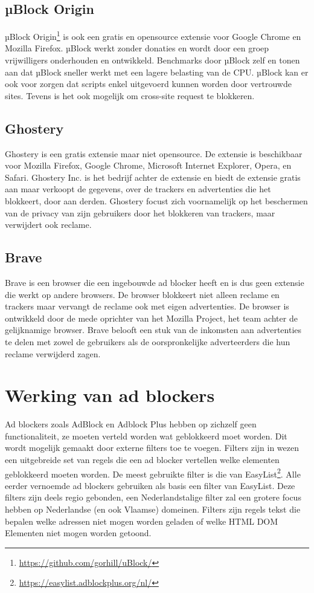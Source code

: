 \documentclass[pdftex,a4paper,12pt,twoside]{report}
\begin{document}
\subsection{µBlock Origin}
\label{sec:uBlock Origin}
µBlock Origin\footnote{\url{https://github.com/gorhill/uBlock/}} is ook een gratis en opensource extensie voor Google Chrome en Mozilla Firefox. µBlock werkt zonder donaties en wordt door een groep vrijwilligers onderhouden en ontwikkeld. Benchmarks door µBlock zelf en \citep{PerformanceAB} tonen aan dat µBlock sneller werkt met een lagere belasting van de CPU. µBlock kan er ook voor zorgen dat scripts enkel uitgevoerd kunnen worden door vertrouwde sites. Tevens is het ook mogelijk om cross-site request te blokkeren.

\subsection{Ghostery}
\label{sec:Ghostery}
Ghostery is een gratis extensie maar niet opensource. De extensie is beschikbaar voor  Mozilla Firefox, Google Chrome, Microsoft Internet Explorer, Opera, en Safari. Ghostery Inc. is het bedrijf achter de extensie en biedt de extensie gratis aan maar verkoopt de gegevens, over de trackers en advertenties die het blokkeert, door aan derden. Ghostery focust zich voornamelijk op het beschermen van de privacy van zijn gebruikers door het blokkeren van trackers, maar verwijdert ook reclame.
\subsection{Brave}
\label{sec:Brave}
Brave is een browser die een ingebouwde ad blocker heeft en is dus geen extensie die werkt op andere browsers. De browser blokkeert niet alleen reclame en trackers maar vervangt de reclame ook met eigen advertenties. De browser is ontwikkeld door de mede oprichter van het Mozilla Project, het team achter de gelijknamige browser. Brave belooft een stuk van de inkomsten aan advertenties te delen met zowel de gebruikers als de oorspronkelijke adverteerders die hun reclame verwijderd zagen.

\section{Werking van ad blockers}
\label{ch:Werking van ad blockers}
Ad blockers zoals AdBlock en Adblock Plus hebben op zichzelf geen functionaliteit, ze moeten verteld worden wat geblokkeerd moet worden. Dit wordt mogelijk gemaakt door externe filters toe te voegen. Filters zijn in wezen een uitgebreide set van regels die een ad blocker vertellen welke elementen geblokkeerd moeten worden. De meest gebruikte filter is die van EasyList\footnote{\url{https://easylist.adblockplus.org/nl/}}. Alle eerder vernoemde ad blockers gebruiken als basis een filter van EasyList. Deze filters zijn deels regio gebonden, een Nederlandstalige filter zal een grotere focus hebben op Nederlandse (en ook Vlaamse) domeinen. Filters zijn regels tekst die bepalen welke adressen niet mogen worden geladen of welke HTML DOM Elementen niet mogen worden getoond.
\end{document}

